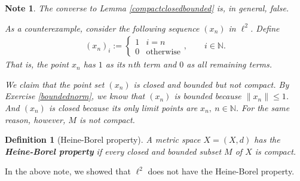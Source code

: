 \documentclass[11pt]{article}
\theoremstyle{mystyle}
\newtheorem{defn}{Definition}[section]
\newtheorem{note}{Note}[section]
\newcommand{\0}{\mathbf{0}}
\begin{document}
\begin{note}
The converse to Lemma \ref{compactclosedbounded} is, in general, false.

As a counterexample, consider the following sequence $(x_n)$ in $\ell^2$. Define
\begin{align*}
    (x_n)_i := 
    \begin{cases}
    1 & i = n\\
    0 & \text{otherwise}
    \end{cases}, \qquad i \in \mathbb{N}.
\end{align*}
That is, the point $x_n$ has $1$ as its $n$th term and $0$ as all remaining terms. 

We claim that the point set $(x_n)$ is closed and bounded but not compact.  By Exercise \ref{boundednorm}, we know that $(x_n)$ is bounded because $\|x_n\| \leq 1$. And $(x_n)$ is closed because its only limit points are $x_n, \ n \in \mathbb{N}$. For the same reason, however, $M$ is not compact. 
\end{note}

\begin{defn}[Heine-Borel property]
A metric space $X = (X,d)$ has the \textbf{Heine-Borel property} if every closed and bounded subset $M$ of $X$ is compact.
\end{defn}
In the above note, we showed that $\ell^2$ does not have the Heine-Borel property.
\end{document}
